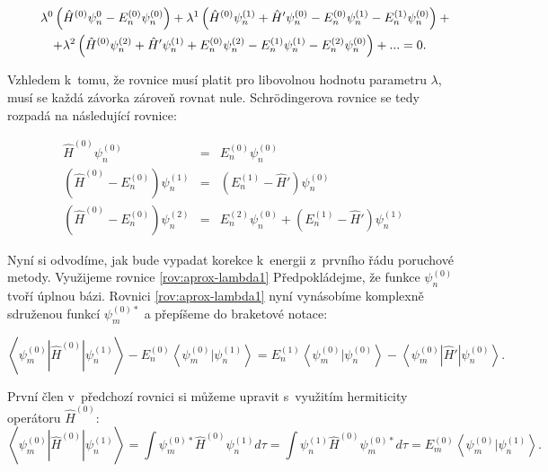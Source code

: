 \begin{eqnarray}
\lefteqn{ \lambda^0\left(\hat{H}^{(0)}\psi^{0}_{n}-E^{(0)}_{n}\psi^{(0)}_{n}\right)+
\lambda^1\left(\hat{H}^{(0)}\psi^{(1)}_{n}+\hat{H}'\psi^{(0)}_{n}-E^{(0)}_{n}\psi^{(1)}_{n}-E^{(1)}_{n}\psi^{(0)}_{n}\right)+{}}
\nonumber\\
&& + 
\lambda^2\left(\hat{H}^{(0)}\psi^{(2)}_{n}+\hat{H}'\psi^{(1)}_{n}+E^{(0)}_{n}\psi^{(2)}_{n}-E^{(1)}_{n}\psi^{(1)}_{n}-E^{(2)}_{n}\psi^{(0)}_{n}\right)+...=0.
\end{eqnarray}

\noindent Vzhledem k~tomu, že rovnice musí platit pro libovolnou hodnotu parametru $\lambda$, musí se každá závorka zároveň rovnat nule. Schrödingerova rovnice se tedy rozpadá na následující rovnice:

\begin{eqnarray}
\hat{H}^{(0)}\psi^{(0)}_{n} &=&E^{(0)}_{n}\psi^{(0)}_{n}\\
\left(\hat{H}^{(0)}-E^{(0)}_{n}\right)\psi^{(1)}_{n} &=&\left(E^{(1)}_{n}-\hat{H}'\right)\psi^{(0)}_{n}
\label{rov:aprox-lambda1} 
\\
\left(\hat{H}^{(0)}-E^{(0)}_{n}\right)\psi^{(2)}_{n} &=&E^{(2)}_{n}\psi^{(0)}_{n}+\left(E^{(1)}_{n}-\hat{H}'\right)\psi^{(1)}_{n}
\end{eqnarray}

Nyní si odvodíme, jak bude vypadat korekce k~energii z~prvního řádu poruchové metody. Využijeme rovnice \ref{rov:aprox-lambda1} Předpokládejme, že funkce $\psi_n^{(0)}$ tvoří úplnou bázi.
Rovnici \ref{rov:aprox-lambda1} nyní vynásobíme komplexně sdruženou funkcí $ \psi_m^{(0)*} $ a přepíšeme do braketové notace:

\begin{equation}
\left < \psi_m^{(0)}|\hat{H}^{(0)}|\psi_n^{(1)} \right >-
E_n^{(0)}\left < \psi_m^{(0)}|\psi_n^{(1)} \right >=
E_n^{(1)}\left < \psi_m^{(0)}|\psi_n^{(0)} \right >-
\left < \psi_m^{(0)}|\hat{H}'|\psi_n^{(0)} \right >.
\label{rov:aprox:poruchaenergie1}
\end{equation}

\noindent První člen v~předchozí rovnici si můžeme upravit s~využitím hermiticity operátoru $\hat{H}^{(0)}$:
\begin{equation}
\left < \psi_m^{(0)}|\hat{H}^{(0)}|\psi_n^{(1)} \right >=
\int \psi_m^{(0)*}\hat{H}^{(0)}\psi_n^{(1)}d\tau=
\int \psi_n^{(1)}\hat{H}^{(0)}\psi_m^{(0)*}d\tau=
E_m^{(0)}\left < \psi_m^{(0)}|\psi_n^{(1)} \right >.
\end{equation}


